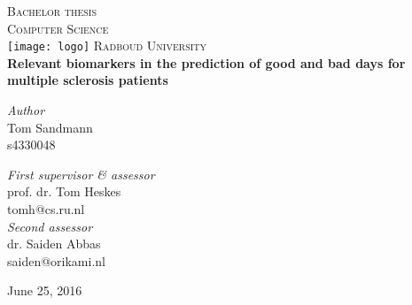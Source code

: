 \begin{titlepage}
	\begin{center}
		\textsc{\LARGE Bachelor thesis\\Computer Science}\\[1.5cm]
		\texttt{[image: logo]}
		\vspace{0.4cm}
		\textsc{\Large Radboud University}\\[1cm]
		\vspace{0.4cm}
		\textbf{\huge Relevant biomarkers in the prediction of good and bad days for multiple sclerosis patients}\\[0.4cm]
		\vspace{2cm}
		\begin{minipage}[t]{0.45\textwidth}
			\begin{flushleft} \large
				\textit{Author}\\
				Tom Sandmann\\
				s4330048
			\end{flushleft}
		\end{minipage}
		\begin{minipage}[t]{0.45\textwidth}
			\begin{flushright} \large
				\textit{First supervisor \& assessor}\\
				prof. dr. Tom Heskes\\
				tomh@cs.ru.nl\\[1.3cm]
				\textit{Second assessor}\\
				dr. Saiden Abbas\\
				saiden@orikami.nl
			\end{flushright}
		\end{minipage}
		\vfill
		{\large June 25, 2016}
	\end{center}
\end{titlepage}
